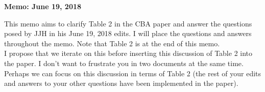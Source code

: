 


\newcommand*\leftright[2]{%
  \leavevmode
  \rlap{#1}%
  \hspace{0.5\linewidth}%
  #2}

\newcommand{\orth}{\ensuremath{\perp\!\!\!\perp}}%
\newcommand{\indep}{\orth}%
\newcommand{\notorth}{\ensuremath{\perp\!\!\!\!\!\!\diagup\!\!\!\!\!\!\perp}}%
\newcommand{\notindep}{\notorth}







\begin{center}
\textbf{Memo: June 19, 2018}
\end{center}

\doublespacing

\noindent This memo aims to clarify Table 2 in the CBA paper and answer the questions posed by JJH in his June 19, 2018 edits. I will place the questions and answers throughout the memo. Note that Table 2 is at the end of this memo.\\

\noindent I propose that we iterate on this before inserting this discussion of Table 2 into the paper. I don't want to frustrate you in two documents at the same time. Perhaps we can focus on this discussion in terms of Table 2 (the rest of your edits and answers to your other questions have been implemented in the paper).\\

